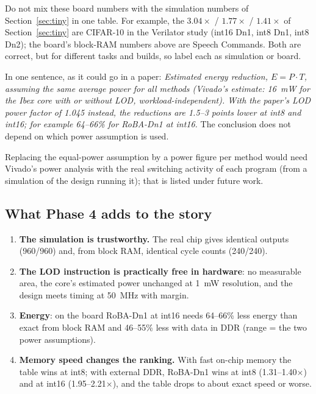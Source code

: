 \begin{careful}
Do not mix these board numbers with the simulation numbers of Section~\ref{sec:tiny} in one table. For example,
the $3.04\times$ / $1.77\times$ / $1.41\times$ of Section~\ref{sec:tiny} are CIFAR-10 in the Verilator study
(int16 Dn1, int8 Dn1, int8 Dn2); the board's block-RAM numbers above are Speech Commands. Both are correct, but
for different tasks and builds, so label each as simulation or board.
\end{careful}

\begin{keyidea}
In one sentence, as it could go in a paper: \emph{Estimated energy reduction, $E = P\cdot T$, assuming the same
average power for all methods (Vivado's estimate: 16~mW for the Ibex core with or without LOD,
workload-independent). With the paper's LOD power factor of 1.045 instead, the reductions are 1.5--3 points lower
at int8 and int16; for example 64--66\% for RoBA-Dn1 at int16.} The conclusion does not depend on which power
assumption is used.
\end{keyidea}

Replacing the equal-power assumption by a power figure per method would need Vivado's power analysis with the
real switching activity of each program (from a simulation of the design running it); that is listed under
future work.

\subsection{What Phase 4 adds to the story}

\begin{enumerate}
  \item \textbf{The simulation is trustworthy.} The real chip gives identical outputs (960/960) and, from block
        RAM, identical cycle counts (240/240).
  \item \textbf{The LOD instruction is practically free in hardware}: no measurable area, the core's estimated
        power unchanged at 1~mW resolution, and the design meets timing at 50~MHz with margin.
  \item \textbf{Energy}: on the board RoBA-Dn1 at int16 needs 64--66\% less energy than exact from block RAM
        and 46--55\% less with data in DDR (range = the two power assumptions).
  \item \textbf{Memory speed changes the ranking.} With fast on-chip memory the table wins at int8; with
        external DDR, RoBA-Dn1 wins at int8 (1.31--1.40$\times$) and at int16 (1.95--2.21$\times$), and the
        table drops to about exact speed or worse.
\end{enumerate}
